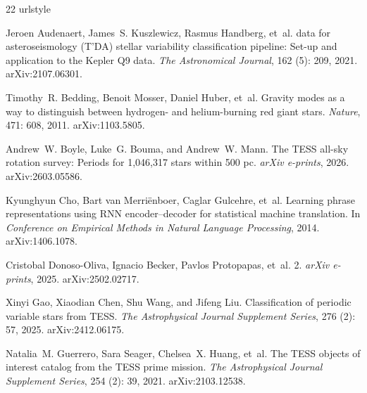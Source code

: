 \documentclass{article}
\begin{document}
\raggedbottom

\begin{thebibliography}{22}
\providecommand{\natexlab}[1]{#1}
\providecommand{\url}[1]{\texttt{#1}}
\expandafter\ifx\csname urlstyle\endcsname\relax
  \providecommand{\doi}[1]{doi: #1}\else
  \providecommand{\doi}{doi: \begingroup \urlstyle{rm}\Url}\fi

Jeroen Audenaert, James~S. Kuszlewicz, Rasmus Handberg, et~al.
 data for asteroseismology ({T'DA}) stellar variability
  classification pipeline: Set-up and application to the {Kepler} {Q9} data.
\newblock \emph{The Astronomical Journal}, 162 (5): 209,
  2021.
\newblock arXiv:2107.06301.

Timothy~R. Bedding, Benoit Mosser, Daniel Huber, et~al.
\newblock Gravity modes as a way to distinguish between hydrogen- and
  helium-burning red giant stars.
\newblock \emph{Nature}, 471: 608, 2011.
\newblock arXiv:1103.5805.

Andrew~W. Boyle, Luke~G. Bouma, and Andrew~W. Mann.
\newblock The {TESS} all-sky rotation survey: Periods for 1,046,317 stars
  within 500 pc.
\newblock \emph{arXiv e-prints}, 2026.
\newblock arXiv:2603.05586.

Kyunghyun Cho, Bart van Merri\"{e}nboer, Caglar Gulcehre, et~al.
\newblock Learning phrase representations using {RNN} encoder--decoder for
  statistical machine translation.
\newblock In \emph{Conference on Empirical Methods in Natural Language
  Processing}, 2014.
\newblock arXiv:1406.1078.

Cristobal Donoso-Oliva, Ignacio Becker, Pavlos Protopapas, et~al.
 2.
\newblock \emph{arXiv e-prints}, 2025.
\newblock arXiv:2502.02717.

Xinyi Gao, Xiaodian Chen, Shu Wang, and Jifeng Liu.
\newblock Classification of periodic variable stars from {TESS}.
\newblock \emph{The Astrophysical Journal Supplement Series}, 276
  (2): 57, 2025.
\newblock arXiv:2412.06175.

Natalia~M. Guerrero, Sara Seager, Chelsea~X. Huang, et~al.
\newblock The {TESS} objects of interest catalog from the {TESS} prime mission.
\newblock \emph{The Astrophysical Journal Supplement Series}, 254
  (2): 39, 2021.
\newblock arXiv:2103.12538.


\end{thebibliography}
\end{document}
